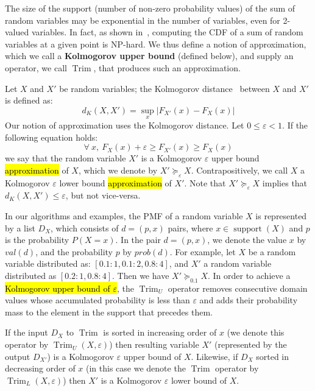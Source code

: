\documentclass[review]{elsarticle}
\DeclareMathOperator{\support}{support}
\DeclareMathOperator{\Trim}{Trim}
\begin{document}
The size of the support (number of non-zero probability values) of the sum of random variables
may be exponential in the number of variables, even for 2-valued variables.
In fact, as shown in~\cite{mohring2001scheduling}, computing the CDF of a sum of random variables at a given point is NP-hard.
We thus define a notion of approximation, 
which we call a {\bf Kolmogorov upper bound} (defined below), and supply an operator, we call $\Trim$, that 
produces such an approximation.

Let $X$ and $X'$ be random variables; 
the Kolmogorov distance~\cite{lilliefors1967kolmogorov} between $X$ and $X'$ is defined as:
\[
d_K(X,X') = \sup_{x} |F_{X'}(x)-F_X(x)|
\]
Our notion of approximation uses the Kolmogorov distance. Let $0\leq\varepsilon<1$. %
If the following equation holds:
\[
\forall ~ x, ~ F_X(x)+\varepsilon \geq F_{X'}(x) \geq F_X(x)
\]
we say that the random variable $X'$ is a Kolmogorov $\varepsilon$ upper bound \hl{approximation} of $X$,
which we denote by $X' \succeq_\varepsilon X$. Contrapositively, we call $X$ a  Kolmogorov $\varepsilon$ lower
bound \hl{approximation} of $X'$. Note that $X' \succeq_\varepsilon X$ implies that $d_K(X,X') \leq \varepsilon$,
but not vice-versa.

In our algorithms and examples,
the PMF of a random variable $X$ is represented by a list $D_X$, 
which consists of $d=(p, x)$ pairs, where $x\in \support(X)$
and $p$ is the probability $P(X=x)$. In the pair $d=(p, x)$, we denote the value $x$
by $val(d)$, and the probability $p$ by $prob(d)$.
For example, let $X$ be a random variable distributed as: $[0.1:1, 0.1:2, 0.8:4]$, and $X'$ a random variable distributed as $[0.2:1, 0.8:4]$. Then we have $X' \succeq_{0.1} X$. In order to achieve a \hl{Kolmogorov upper bound of $\varepsilon$},
the $\Trim_U$ operator removes consecutive domain values whose accumulated probability is
less than $\varepsilon$ and adds 
their probability mass to the element in the support that precedes them.

If the input $D_X$ to $\Trim$ is sorted in increasing order of $x$ (we denote this operator by $\Trim_U(X, \varepsilon)$)
then resulting variable $X'$ (represented by the output $D_{X'}$) 
is a Kolmogorov $\varepsilon$ upper bound of $X$.
Likewise, if $D_X$ sorted in decreasing order of $x$ 
(in this case we denote the $\Trim$ operator
by $\Trim_L(X, \varepsilon)$) then $X'$ is a Kolmogorov $\varepsilon$ 
lower bound of $X$. 
\end{document}
